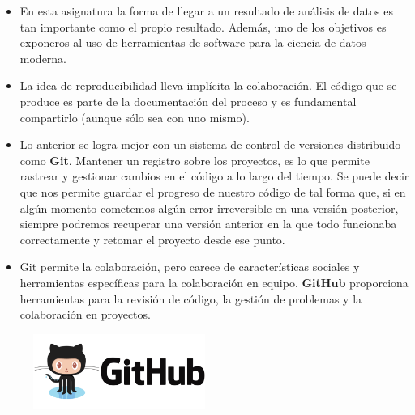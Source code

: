 \documentclass[
  letterpaper,
  DIV=11,
  numbers=noendperiod]{scrreprt}
\begin{document}
\begin{itemize}
\item
  En esta asignatura la forma de llegar a un resultado de análisis de
  datos es tan importante como el propio resultado. Además, uno de los
  objetivos es exponeros al uso de herramientas de software para la
  ciencia de datos moderna.
\item
  La idea de reproducibilidad lleva implícita la colaboración. El código
  que se produce es parte de la documentación del proceso y es
  fundamental compartirlo (aunque sólo sea con uno mismo).
\item
  Lo anterior se logra mejor con un sistema de control de versiones
  distribuido como \textbf{Git}. Mantener un registro sobre los
  proyectos, es lo que permite rastrear y gestionar cambios en el código
  a lo largo del tiempo. Se puede decir que nos permite guardar el
  progreso de nuestro código de tal forma que, si en algún momento
  cometemos algún error irreversible en una versión posterior, siempre
  podremos recuperar una versión anterior en la que todo funcionaba
  correctamente y retomar el proyecto desde ese punto.
\item
  Git permite la colaboración, pero carece de características sociales y
  herramientas específicas para la colaboración en equipo.
  \textbf{GitHub} proporciona herramientas para la revisión de código,
  la gestión de problemas y la colaboración en proyectos.
\end{itemize}

\begin{figure}

{\centering \includegraphics[width=0.5\textwidth,height=\textheight]{Figuras/GitHub.png}

}

\end{figure}
\end{document}
